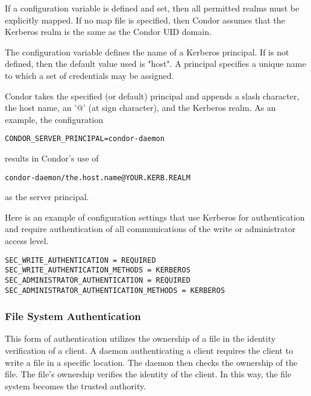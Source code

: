 If a 
configuration variable is defined and set,
then all permitted realms must be explicitly mapped.
If no map file is specified, then Condor assumes that the
Kerberos realm is the same as the Condor UID domain.

The configuration variable
defines the name of a Kerberos principal.
If  is not defined,
then the default value used is "host".
A principal specifies a unique name to which a set of credentials
may be assigned.

Condor takes the specified (or default) principal and appends
a slash character, the host name, an '@' (at sign character),
and the Kerberos realm.
As an example, the configuration
\begin{verbatim}
CONDOR_SERVER_PRINCIPAL=condor-daemon
\end{verbatim}
results in Condor's use of
\begin{verbatim}
condor-daemon/the.host.name@YOUR.KERB.REALM
\end{verbatim}
as the server principal.

Here is
an example of configuration settings that use Kerberos for
authentication and require authentication of all communications
of the write or administrator access level.
\begin{verbatim}
SEC_WRITE_AUTHENTICATION = REQUIRED
SEC_WRITE_AUTHENTICATION_METHODS = KERBEROS
SEC_ADMINISTRATOR_AUTHENTICATION = REQUIRED
SEC_ADMINISTRATOR_AUTHENTICATION_METHODS = KERBEROS
\end{verbatim}

\subsubsection{\label{sec:FS-Authentication}File System Authentication}

This form of authentication utilizes the ownership of a file
in the identity verification of a client.
A daemon authenticating a client requires the client to write
a file in a specific location.
The daemon then checks the ownership of the file.
The file's ownership verifies the identity of the client.
In this way, the file system becomes the trusted authority.


